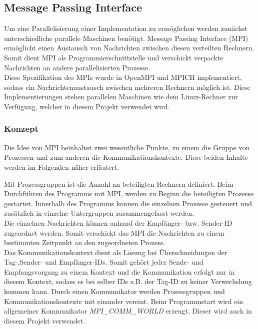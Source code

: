 \subsection{Message Passing Interface}
Um eine Parallelisierung einer Implementation zu ermöglichen werden zunächst unterschiedliche parallele Maschinen benötigt.
Message Passing Interface (MPI) ermöglicht einen Austausch von Nachrichten zwischen diesen verteilten Rechnern. Somit dient MPI als Programmierschnittstelle und verschickt verpackte Nachrichten an andere parallelisierten Prozesse.\\
Diese Spezifikation des MPIs wurde in OpenMPI und MPICH implementiert, sodass ein Nachrichtenaustausch zwischen mehreren Rechnern möglich ist. 
Diese Implementierungen stehen parallelen Maschinen wie dem Linux-Rechner zur Verfügung, welcher in diesem Projekt verwendet wird.\\ 
\subsubsection{Konzept}
Die Idee von MPI beinhaltet zwei wesentliche Punkte, zu einem die Gruppe von Prozessen und zum anderen die Kommunikationskontexte. Diese beiden Inhalte werden im Folgenden näher erläutert.

Mit Prozessgruppen ist die Anzahl an beteiligten Rechnern definiert. Beim Durchführen des Programms mit MPI, werden zu Beginn die beteiligten Prozesse gestartet. Innerhalb des Programms können die einzelnen Prozesse gesteuert und zusätzlich in einzelne Untergruppen zusammengefasst werden. \\
Die einzelnen Nachrichten können anhand der Empfänger- bzw. Sender-ID zugeordnet werden. Somit verschickt das MPI die Nachrichten zu einem bestimmten Zeitpunkt an den zugeordneten Prozess.\\
Das Kommunikationskontext dient als Lösung bei Überschneidungen der Tag-,Sender- und Empfänger-IDs. Somit gehört jeder Sende- und Empfangsvorgang zu einem Kontext und die Kommunikation erfolgt nur in diesem Kontext, sodass es bei selber IDs z.B. der Tag-ID zu keiner Verwechslung kommen kann. 
Durch einen Kommunikator werden Prozessgruppen und Kommunikationskontexte mit einander vereint. Beim Programmstart wird ein allgemeiner Kommunikator \textit{MPI\_COMM\_WORLD} erzeugt. Dieser wird auch in diesem Projekt verwendet.\\
